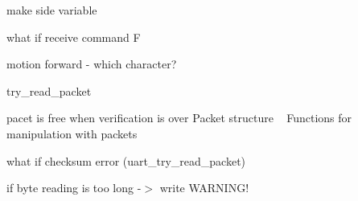 
\begin{DoxyRefList}
\item[\label{todo__todo000001}%
\hypertarget{todo__todo000001}{}%
File \hyperlink{config_8h}{config.h} ]make side variable  
\item[\label{todo__todo000003}%
\hypertarget{todo__todo000003}{}%
File \hyperlink{motion_8c}{motion.c} ]what if receive command \textquotesingle{}F\textquotesingle{} 

motion forward -\/ which character?  
\item[\label{todo__todo000004}%
\hypertarget{todo__todo000004}{}%
File \hyperlink{packet_8c}{packet.c} ]try\+\_\+read\+\_\+packet  
\item[\label{todo__todo000005}%
\hypertarget{todo__todo000005}{}%
File \hyperlink{packet_8h}{packet.h} ]pacet is free when verification is over Packet structure ~\newline
Functions for manipulation with packets  
\item[\label{todo__todo000006}%
\hypertarget{todo__todo000006}{}%
File \hyperlink{uart_8c}{uart.c} ]what if checksum error (uart\+\_\+try\+\_\+read\+\_\+packet) 

if byte reading is too long -\/$>$ write W\+A\+R\+N\+I\+N\+G! 
\end{DoxyRefList}